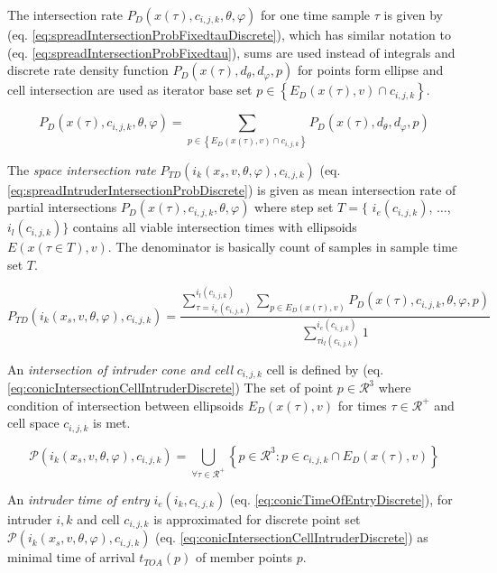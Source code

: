 \noindent The intersection rate $P_D({x}(\tau),c_{i,j,k},\theta,\varphi)$ for one time sample $\tau$ is given by (eq. \ref{eq:spreadIntersectionProbFixedtauDiscrete}), which has similar notation to (eq. \ref{eq:spreadIntersectionProbFixedtau}), sums are used instead of integrals and discrete rate density function $P_D({x}(\tau),d_\theta,d_\varphi,{p})$ for points form ellipse and cell intersection are used as iterator base set ${p}\in\left\{E_D({x}(\tau),{v})\cap c_{i,j,k}\right\}$.

\begin{equation}\label{eq:spreadIntersectionProbFixedtauDiscrete}
    P_D({x}(\tau),c_{i,j,k},\theta,\varphi) =\sum_{{p}\in \left\{E_D({x}(\tau),{v})\cap c_{i,j,k}\right\}} P_D({x}(\tau),d_\theta,d_\varphi,{p})
\end{equation}

\noindent The \emph{space intersection rate} $P_{TD}(i_k({x}_s,{v},\theta,\varphi),c_{i,j,k})$ (eq. \ref{eq:spreadIntruderIntersectionProbDiscrete}) is given as mean intersection rate of partial intersections $P_D({x}(\tau),c_{i,j,k},\theta,\varphi)$ where step set $T=\{$ $i_e(c_{i,j,k})$, $\dots$, $i_l(c_{i,j,k})\}$ contains all viable intersection times with ellipsoids $E({x}(\tau\in T),{v})$. The denominator is basically count of samples in sample time set $T$. 

\begin{equation}\label{eq:spreadIntruderIntersectionProbDiscrete} 
    P_{TD}(i_k({x}_s,{v},\theta,\varphi),c_{i,j,k})=\frac{\sum_{\tau=i_e(c_{i,j,k})}^{i_l(c_{i,j,k})} \sum_{{p}\in E_D({x}(\tau),{v})}P_D({x}(\tau),c_{i,j,k},\theta,\varphi,{p})}{\sum_{\tau i_l(c_{i,j,k})}^{i_e(c_{i,j,k})} 1}
\end{equation}

\noindent An \emph{intersection of intruder cone and cell} $c_{i,j,k}$ cell is defined by (eq. \ref{eq:conicIntersectionCellIntruderDiscrete}) The  set of point ${p}\in\mathscr{R}^3$ where condition of intersection between ellipsoids $E_D({x}(\tau),{v})$ for times $\tau\in\mathscr{R}^+$ and cell space $c_{i,j,k}$ is met.

\begin{equation}\label{eq:conicIntersectionCellIntruderDiscrete}
    \mathscr{P}(i_k({x}_s,{v},\theta,\varphi),c_{i,j,k})= \bigcup_{\forall \tau\in\mathscr{R}^+} \left\{{p}\in\mathscr{R}^3:{p}\in c_{i,j,k}\cap E_D({x}(\tau),{v})\right\}
\end{equation}

\noindent An \emph{intruder time of entry} $i_e(i_k,c_{i,j,k})$ (eq. \ref{eq:conicTimeOfEntryDiscrete}), for intruder $i,k$ and cell $c_{i,j,k}$ is approximated for discrete point set  $\mathscr{P}(i_k({x}_s,{v},\theta,\varphi),c_{i,j,k})$ (eq. \ref{eq:conicIntersectionCellIntruderDiscrete}) as minimal time of arrival $t_{TOA}({p})$ of member points ${p}$.

